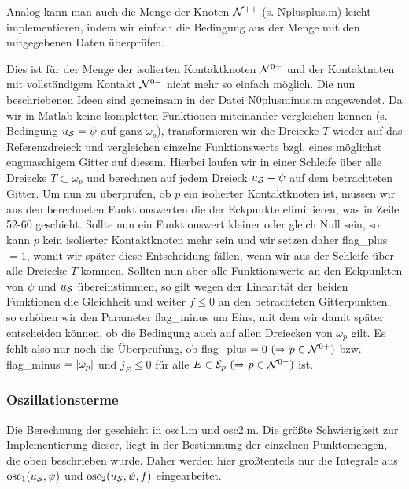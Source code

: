 Analog kann man auch die Menge der Knoten $\mathcal N^{++}$ (s. {\ttfamily Nplusplus.m}) leicht implementieren, indem wir einfach die Bedingung aus der Menge mit den mitgegebenen Daten überprüfen.

Dies ist für der Menge der isolierten Kontaktknoten $\mathcal N^{0+}$ und der Kontaktnoten mit vollständigem Kontakt $\mathcal N^{0-}$ nicht mehr so einfach möglich. Die nun beschriebenen Ideen sind gemeinsam in der Datei {\ttfamily N0plusminus.m} angewendet. Da wir in Matlab keine kompletten Funktionen miteinander vergleichen können (s. Bedingung $u_{\mathcal S} = \psi$ auf ganz $\omega_p$), transformieren wir die Dreiecke $T$ wieder auf das Referenzdreieck und vergleichen einzelne Funktionswerte bzgl. eines möglichst engmaschigem Gitter auf diesem. Hierbei laufen wir in einer Schleife über alle Dreiecke $T \subset \omega_p$ und berechnen auf jedem Dreieck $u_{\mathcal S}-\psi$ auf dem betrachteten Gitter. Um nun zu überprüfen, ob $p$ ein isolierter Kontaktknoten ist, müssen wir aus den berechneten Funktionswerten die der Eckpunkte eliminieren, was in Zeile 52-60 geschieht. Sollte nun ein Funktionswert kleiner oder gleich Null sein, so kann $p$ kein isolierter Kontaktknoten mehr sein und wir setzen daher {\ttfamily flag_plus}$=1$, womit wir später diese Entscheidung fällen, wenn wir aus der Schleife über alle Dreiecke $T$ kommen. Sollten nun aber alle Funktionswerte an den Eckpunkten von $\psi$ und $u_{\mathcal S}$ übereinstimmen, so gilt wegen der Linearität der beiden Funktionen die Gleichheit und weiter $f\le 0$ an den betrachteten Gitterpunkten, so erhöhen wir den Parameter {\ttfamily flag_minus} um Eins, mit dem wir  damit später entscheiden können, ob die Bedingung auch auf allen Dreiecken von $\omega_p$ gilt. Es fehlt also nur noch die Überprüfung, ob {\ttfamily flag_plus}$\ =0 \ (\Rightarrow p \in \mathcal N^{0+})$ bzw. {\ttfamily flag_minus}$\ =\abs{\omega_p}$ und $j_E \le 0$ für alle $E \in\mathcal E_p \ (\Rightarrow p \in \mathcal N^{0-})$ ist.


\subsubsection{Oszillationsterme}

Die Berechnung der  geschieht in {\ttfamily osc1.m} und {\ttfamily osc2.m}. Die größte Schwierigkeit zur Implementierung dieser, liegt in der Bestimmung der einzelnen Punktemengen, die oben beschrieben wurde. Daher werden hier größtenteils nur die Integrale aus $\operatorname{osc}_1(u_{\mathcal S},\psi)$ und $\operatorname{osc}_2(u_{\mathcal S},\psi,f)$ eingearbeitet.



